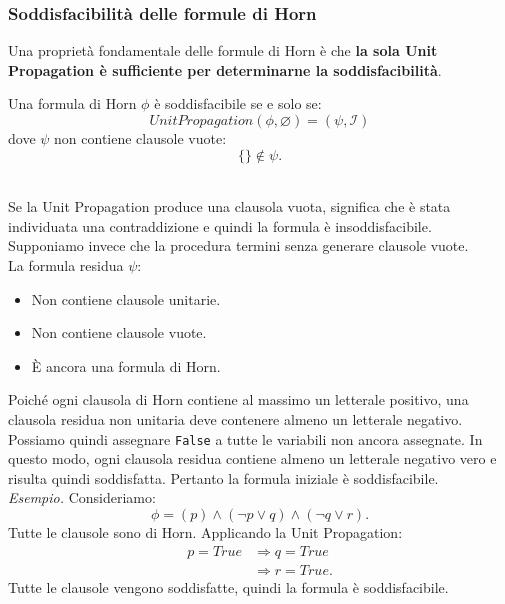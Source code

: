 \subsubsection*{Soddisfacibilità delle formule di Horn}
Una proprietà fondamentale delle formule
di Horn è che \textbf{la sola Unit Propagation
è sufficiente per determinarne la
soddisfacibilità}.\smallskip\\
\colorbox{SALZO}{\parbox{\dimexpr\linewidth-2\fboxsep}{
\begin{theorem}
Una formula di Horn $\phi$ è soddisfacibile
se e solo se:
\[
UnitPropagation(\phi,\varnothing)
=(\psi,\mathcal I)
\]
dove $\psi$ non contiene clausole vuote:
\[
\boxed{\{\}\notin\psi.}
\]
\end{theorem}
}}\smallskip\\
Se la Unit Propagation produce una
clausola vuota, significa che è stata
individuata una contraddizione e quindi
la formula è insoddisfacibile.
Supponiamo invece che la procedura termini
senza generare clausole vuote.\\
La formula residua $\psi$:
\begin{itemize}
    \item Non contiene clausole unitarie.
    \item Non contiene clausole vuote.
    \item È ancora una formula di Horn.
\end{itemize}
Poiché ogni clausola di Horn contiene
al massimo un letterale positivo, una
clausola residua non unitaria deve
contenere almeno un letterale negativo.
Possiamo quindi assegnare
\texttt{False} a tutte le variabili
non ancora assegnate.
In questo modo, ogni clausola residua
contiene almeno un letterale negativo vero
e risulta quindi soddisfatta.
Pertanto la formula iniziale è soddisfacibile.\smallskip\\
\textit{Esempio.} Consideriamo:
\[
\phi=
(p)\land(\neg p\lor q)\land(\neg q\lor r).
\]
Tutte le clausole sono di Horn.
Applicando la Unit Propagation:
\[
\begin{aligned}
p=True
&\Rightarrow q=True\\
&\Rightarrow r=True.
\end{aligned}
\]
Tutte le clausole vengono soddisfatte,
quindi la formula è soddisfacibile.


